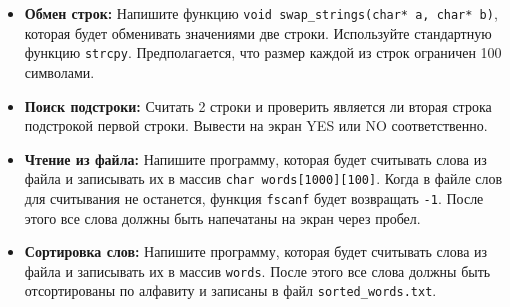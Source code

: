 \documentclass{article}
\begin{document}
\begin{itemize}
\item \textbf{Обмен строк:} Напишите функцию \texttt{void swap\_strings(char* a, char* b)}, которая будет обменивать значениями две строки. Используйте стандартную функцию \texttt{strcpy}. Предполагается, что размер каждой из строк ограничен 100 символами.
\item \textbf{Поиск подстроки:} Считать 2 строки и проверить является ли вторая строка подстрокой первой строки. Вывести на экран YES или NO соответственно.
\end{itemize}
\begin{itemize}
\item \textbf{Чтение из файла:} Напишите программу, которая будет считывать слова из файла и записывать их в массив \texttt{char words[1000][100]}. Когда в файле слов для считывания не останется, функция \texttt{fscanf} будет возвращать \texttt{-1}. После этого все слова должны быть напечатаны на экран через пробел. 
\item \textbf{Сортировка слов:} Напишите программу, которая будет считывать слова из файла и записывать их в массив \texttt{words}. После этого все слова должны быть отсортированы по алфавиту и записаны в файл \texttt{sorted\_words.txt}.
\end{itemize}
\end{document}
